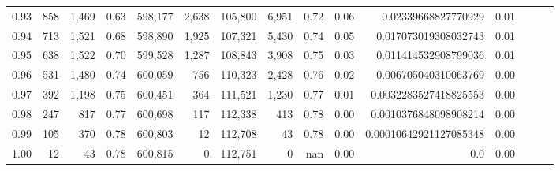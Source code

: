 \begin{tabular}{rrrrrrrrrrrrrrr}
0.93 &    858 &  1,469 &  0.63 &  598,177 &    2,638 &  105,800 &    6,951 &  0.72 &  0.06 &     0.02339668827770929 &      0.01 \\
0.94 &    713 &  1,521 &  0.68 &  598,890 &    1,925 &  107,321 &    5,430 &  0.74 &  0.05 &    0.017073019308032743 &      0.01 \\
0.95 &    638 &  1,522 &  0.70 &  599,528 &    1,287 &  108,843 &    3,908 &  0.75 &  0.03 &    0.011414532908799036 &      0.01 \\
0.96 &    531 &  1,480 &  0.74 &  600,059 &      756 &  110,323 &    2,428 &  0.76 &  0.02 &    0.006705040310063769 &      0.00 \\
0.97 &    392 &  1,198 &  0.75 &  600,451 &      364 &  111,521 &    1,230 &  0.77 &  0.01 &   0.0032283527418825553 &      0.00 \\
0.98 &    247 &    817 &  0.77 &  600,698 &      117 &  112,338 &      413 &  0.78 &  0.00 &   0.0010376848098908214 &      0.00 \\
0.99 &    105 &    370 &  0.78 &  600,803 &       12 &  112,708 &       43 &  0.78 &  0.00 &  0.00010642921127085348 &      0.00 \\
1.00 &     12 &     43 &  0.78 &  600,815 &        0 &  112,751 &        0 &   nan &  0.00 &                     0.0 &      0.00 \\
\bottomrule
\end{tabular}
